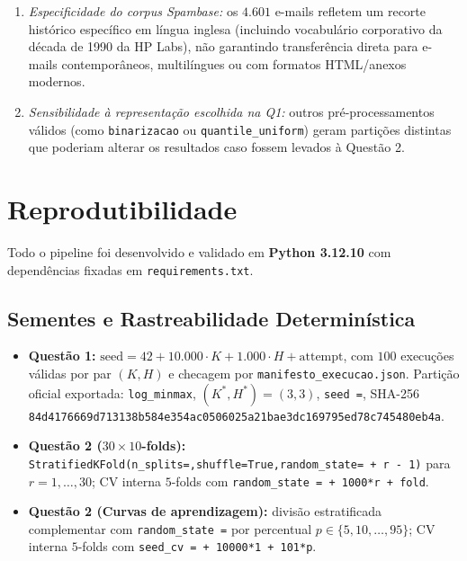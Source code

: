 \documentclass[a4paper,11pt]{article}
\begin{document}
\begin{itemize}[leftmargin=1.5em, itemsep=0.25em, topsep=0.25em]
\begin{enumerate}[leftmargin=1.5em, itemsep=0.25em, topsep=0.25em]
  \item \textit{Especificidade do corpus Spambase:} os $4.601$ e-mails refletem um recorte histórico específico em língua inglesa (incluindo vocabulário corporativo da década de 1990 da HP Labs), não garantindo transferência direta para e-mails contemporâneos, multilíngues ou com formatos HTML/anexos modernos.
  \item \textit{Sensibilidade à representação escolhida na Q1:} outros pré-processamentos válidos (como \texttt{binarizacao} ou \texttt{quantile\_\allowbreak uniform}) geram partições distintas que poderiam alterar os resultados caso fossem levados à Questão 2.
\end{enumerate}
\end{itemize}

\section{Reprodutibilidade}\label{sec:4-reprodutibilidade}


Todo o pipeline foi desenvolvido e validado em \textbf{Python 3.12.10} com dependências fixadas em \texttt{requirements.txt}.

\subsection{Sementes e Rastreabilidade Determinística}\label{sec:4-1-sementes-e-rastreabilidade-deterministica}


\begin{itemize}[leftmargin=1.5em, itemsep=0.25em, topsep=0.25em]
  \item \textbf{Questão 1:} $\text{seed} = 42 + 10.000 \cdot K + 1.000 \cdot H + \text{attempt}$, com $100$ execuções válidas por par $(K, H)$ e checagem por \texttt{manifesto\_\allowbreak execucao.json}. Partição oficial exportada: \texttt{log\_\allowbreak minmax}, $(K^*, H^*) = (3, 3)$, \texttt{seed =}, SHA-256 \texttt{84d4176669d71313\allowbreak 8b584e354ac05060\allowbreak 25a21bae3dc16979\allowbreak 5ed78c745480eb4a}.
  \item \textbf{Questão 2 ($30 \times 10$-folds):} \texttt{StratifiedKFold(\allowbreak n\_\allowbreak splits=,\allowbreak  shuffle=\allowbreak True,\allowbreak  random\_\allowbreak state= + r - 1)} para $r = 1, \ldots, 30$; CV interna $5$-folds com \texttt{random\_\allowbreak state = + 1000*r + fold}.
  \item \textbf{Questão 2 (Curvas de aprendizagem):} divisão estratificada complementar com \texttt{random\_\allowbreak state =} por percentual $p \in \{5, 10, \ldots, 95\}$; CV interna $5$-folds com \texttt{seed\_\allowbreak cv = + 10000*1 + 101*p}.
\end{itemize}
\end{document}
